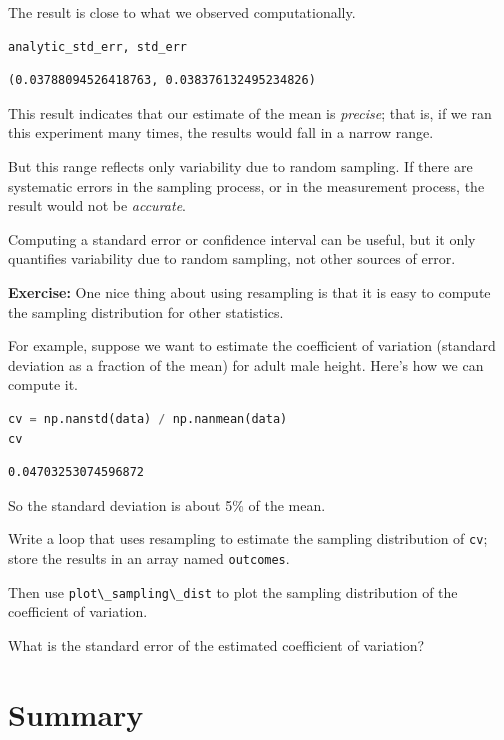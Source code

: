 The result is close to what we observed computationally.

\begin{lstlisting}[language=Python,style=source]
analytic_std_err, std_err
\end{lstlisting}

\begin{lstlisting}[style=output]
(0.03788094526418763, 0.038376132495234826)
\end{lstlisting}

This result indicates that our estimate of the mean is \emph{precise};
that is, if we ran this experiment many times, the results would fall in
a narrow range.

But this range reflects only variability due to random sampling. If
there are systematic errors in the sampling process, or in the
measurement process, the result would not be \emph{accurate}.

Computing a standard error or confidence interval can be useful, but it
only quantifies variability due to random sampling, not other sources of
error.

\textbf{Exercise:} One nice thing about using resampling is that it is
easy to compute the sampling distribution for other statistics.

For example, suppose we want to estimate the coefficient of variation
(standard deviation as a fraction of the mean) for adult male height.
Here's how we can compute it.

\begin{lstlisting}[language=Python,style=source]
cv = np.nanstd(data) / np.nanmean(data)
cv
\end{lstlisting}

\begin{lstlisting}[style=output]
0.04703253074596872
\end{lstlisting}

So the standard deviation is about 5\% of the mean.

Write a loop that uses resampling to estimate the sampling distribution
of \passthrough{\lstinline!cv!}; store the results in an array named
\passthrough{\lstinline!outcomes!}.

Then use \passthrough{\lstinline!plot\_sampling\_dist!} to plot the
sampling distribution of the coefficient of variation.

What is the standard error of the estimated coefficient of variation?

\hypertarget{summary}{%
\section{Summary}\label{summary}}

